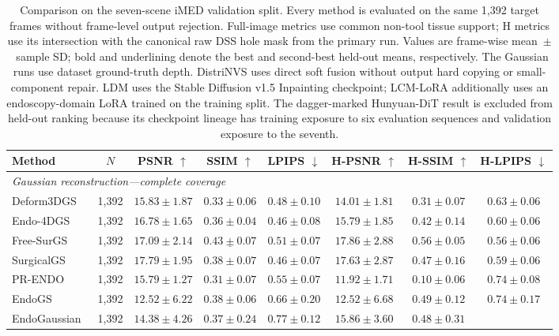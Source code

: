 \documentclass[letterpaper,10pt,conference]{ieeeconf}
\begin{document}
\begin{table}[t]
\centering
\caption{Comparison on the seven-scene iMED validation split. Every method is
evaluated on the same 1,392 target frames without frame-level output rejection.
Full-image metrics use common non-tool tissue support; H metrics use its
intersection with the canonical raw DSS hole mask from the primary run. Values
are frame-wise mean~$\pm$~sample SD;
bold and underlining denote the best and second-best held-out means,
respectively. The Gaussian runs use dataset ground-truth
depth. DistriNVS uses direct soft fusion without output hard
copying or small-component repair. LDM uses the Stable Diffusion v1.5
Inpainting checkpoint; LCM-LoRA additionally uses an endoscopy-domain LoRA
trained on the training split. The dagger-marked Hunyuan-DiT result is excluded
from held-out ranking because its checkpoint lineage has training exposure to
six evaluation sequences and validation exposure to the seventh.}
\label{tab:validation-comparison}
\small
\setlength{\tabcolsep}{2.0pt}
\begin{tabular}{lccccccc}
\toprule
Method & $N$ & PSNR $\uparrow$ & SSIM $\uparrow$ & LPIPS $\downarrow$ &
H-PSNR $\uparrow$ & H-SSIM $\uparrow$ & H-LPIPS $\downarrow$ \\
\midrule
\multicolumn{8}{l}{\textit{Gaussian reconstruction---complete coverage}} \\
Deform3DGS~\cite{yang2024deform3dgs} & 1,392 & $15.83\pm1.87$ & $0.33\pm0.06$ &
$0.48\pm0.10$ & $14.01\pm1.81$ & $0.31\pm0.07$ & $0.63\pm0.06$ \\
Endo-4DGS~\cite{huang2024endo4dgs} & 1,392 & $16.78\pm1.65$ & $0.36\pm0.04$ &
$0.46\pm0.08$ & $15.79\pm1.85$ & $0.42\pm0.14$ & $0.60\pm0.06$ \\
Free-SurGS~\cite{guo2024freesurgs} & 1,392 & $17.09\pm2.14$ & $\underline{0.43\pm0.07}$ &
$0.51\pm0.07$ & $17.86\pm2.88$ & $0.56\pm0.05$ & $0.56\pm0.06$ \\
SurgicalGS~\cite{chen2025surgicalgs} & 1,392 & $17.79\pm1.95$ & $0.38\pm0.07$ &
$0.46\pm0.07$ & $17.63\pm2.87$ & $0.47\pm0.16$ & $0.59\pm0.06$ \\
PR-ENDO~\cite{kaleta2025prendo} & 1,392 & $15.79\pm1.27$ & $0.31\pm0.07$ &
$0.55\pm0.07$ & $11.92\pm1.71$ & $0.10\pm0.06$ & $0.74\pm0.08$ \\
EndoGS~\cite{zhu2024endogs} & 1,392 & $12.52\pm6.22$ & $0.38\pm0.06$ &
$0.66\pm0.20$ & $12.52\pm6.68$ & $0.49\pm0.12$ & $0.74\pm0.17$ \\
EndoGaussian~\cite{liu2025endogaussian} & 1,392 & $14.38\pm4.26$ &
$0.37\pm0.24$ & $0.77\pm0.12$ & $15.86\pm3.60$ & $0.48\pm0.31$ &

\end{tabular}
\end{table}
\end{document}
